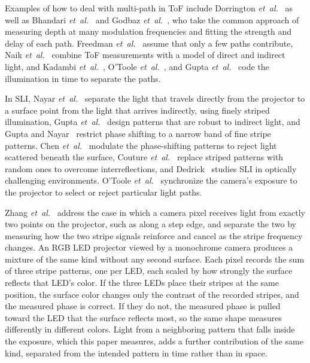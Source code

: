 \documentclass[10pt,journal,compsoc]{IEEEtran}
\begin{document}
Examples of how to deal with multi-path in ToF include Dorrington
\emph{et~al.}~\cite{dorrington2011separating} as well as Bhandari
\emph{et~al.}~\cite{bhandari2013multifrequency} and Godbaz \emph{et~al.}~\cite{godbaz2012closed},
who take the common approach of measuring depth at many modulation frequencies and fitting the
strength and delay of each path. Freedman \emph{et~al.}~\cite{freedman2014sra} assume that only a
few paths contribute, Naik \emph{et~al.}~\cite{naik2015light} combine ToF measurements with a model
of direct and indirect light, and Kadambi \emph{et~al.}~\cite{kadambi2013coded}, O'Toole
\emph{et~al.}~\cite{otoole2014temporal}, and Gupta \emph{et~al.}~\cite{gupta2015phasor} code the
illumination in time to separate the paths.

In SLI, Nayar \emph{et~al.}~\cite{nayar2006separation} separate the light that travels directly
from the projector to a surface point from the light that arrives indirectly, using finely
striped illumination, Gupta \emph{et~al.}~\cite{gupta2011global} design patterns that are robust
to indirect light, and Gupta and Nayar~\cite{gupta2012micro} restrict phase shifting to a narrow
band of fine stripe patterns. Chen \emph{et~al.}~\cite{chen2008modulated} modulate the
phase-shifting patterns to reject light scattered beneath the surface, Couture
\emph{et~al.}~\cite{couture2011unstructured} replace striped patterns with random ones to
overcome interreflections, and Dedrick~\cite{dedrick2011sli} studies SLI in optically
challenging environments. O'Toole
\emph{et~al.}~\cite{otoole2012primaldual,otoole2014slt,otoole2015homogeneous} synchronize the
camera's exposure to the projector to select or reject particular light paths.

Zhang \emph{et~al.}~\cite{zhang2019bimodal,zhang2024bimodalps} address the case in which a camera
pixel receives light from exactly two points on the projector, such as along a step edge, and
separate the two by measuring how the two stripe signals reinforce and cancel as the stripe
frequency changes. An RGB LED projector viewed by a monochrome camera produces a mixture of the
same kind without any second surface. Each pixel records the sum of three stripe patterns, one
per LED, each scaled by how strongly the surface reflects that LED's color. If the three LEDs
place their stripes at the same position, the surface color changes only the contrast of the
recorded stripes, and the measured phase is correct. If they do not, the measured phase is pulled
toward the LED that the surface reflects most, so the same shape measures differently in
different colors. Light from a neighboring pattern that falls inside the exposure, which this
paper measures, adds a further contribution of the same kind, separated from the intended pattern
in time rather than in space.
\end{document}
